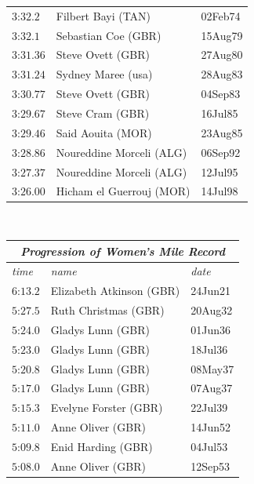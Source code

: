 \begin{figure}
{{\begin{tabular}[t]{|l|ll|}
         $\text{3:32}.2$   &Filbert Bayi (TAN)     &02Feb74  \\
         $\text{3:32}.1$   &Sebastian Coe (GBR)    &15Aug79  \\
         $\text{3:31}.36$  &Steve Ovett (GBR)      &27Aug80  \\
         $\text{3:31}.24$  &Sydney Maree (usa)     &28Aug83  \\
         $\text{3:30}.77$  &Steve Ovett (GBR)      &04Sep83  \\
         $\text{3:29}.67$  &Steve Cram (GBR)       &16Jul85  \\
         $\text{3:29}.46$  &Said Aouita (MOR)      &23Aug85  \\
         $\text{3:28}.86$  &Noureddine Morceli (ALG)  &06Sep92  \\
         $\text{3:27}.37$  &Noureddine Morceli (ALG)  &12Jul95  \\
         $\text{3:26}.00$  &Hicham el Guerrouj (MOR)  &14Jul98  \\
     \hline
     \end{tabular}
      \   %
        \begin{tabular}[t]{|l|ll|}
        \hline
          \multicolumn{3}{|c|}{\textit{Progression of Women's Mile Record}}  \\
        \hline
        \textit{time}  &\textit{name}  &\textit{date}  \\
         \hline
           $\text{6:13}.2$    &Elizabeth Atkinson (GBR)    &24Jun21 \\
           $\text{5:27}.5$    &Ruth Christmas (GBR)        &20Aug32 \\
           $\text{5:24}.0$    &Gladys Lunn (GBR)           &01Jun36 \\
           $\text{5:23}.0$    &Gladys Lunn (GBR)           &18Jul36 \\
           $\text{5:20}.8$    &Gladys Lunn (GBR)           &08May37 \\
           $\text{5:17}.0$    &Gladys Lunn (GBR)           &07Aug37 \\
           $\text{5:15}.3$    &Evelyne Forster (GBR)       &22Jul39 \\
           $\text{5:11}.0$    &Anne Oliver (GBR)           &14Jun52 \\
           $\text{5:09}.8$    &Enid Harding (GBR)          &04Jul53 \\
           $\text{5:08}.0$    &Anne Oliver (GBR)           &12Sep53 \\

\end{tabular}}}
\end{figure}
